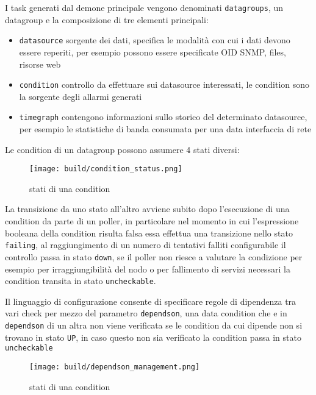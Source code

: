 \documentclass[12pt,a4paper,twoside,openright]{book}
\begin{document}
I task generati dal demone principale vengono denominati \verb|datagroups|, un datagroup e la composizione di tre elementi principali:

\begin{itemize}
  \item \verb|datasource| sorgente dei dati, specifica le modalità con cui i dati devono essere reperiti, per esempio possono essere specificate OID SNMP, files, risorse web
  \item \verb|condition| controllo da effettuare sui datasource interessati, le condition sono la sorgente degli allarmi generati
  \item \verb|timegraph| contengono informazioni sullo storico del determinato datasource, per esempio le statistiche di banda consumata per una data interfaccia di rete
\end{itemize}

Le condition di un datagroup possono assumere 4 stati diversi:

\begin{figure}[H]
    \centering
    \texttt{[image: build/condition\_status.png]}
    \caption{stati di una condition}
    \label{fig:enter-label}
\end{figure}

La transizione da uno stato all'altro avviene subito dopo l'esecuzione di una condition da parte di un poller, in particolare nel momento in cui l'espressione booleana della condition risulta falsa essa effettua una transizione nello stato \verb|failing|, al raggiungimento di un numero di tentativi falliti configurabile il controllo passa in stato \verb|down|, se il poller non riesce a valutare la condizione per esempio per irraggiungibilità del nodo o per fallimento di servizi necessari la condition transita in stato \verb|uncheckable|.

Il linguaggio di configurazione consente di specificare regole di dipendenza tra vari check per mezzo del parametro \verb|dependson|, una data condition che e in \verb|dependson| di un altra non viene verificata se le condition da cui dipende non si trovano in stato \verb|UP|, in caso questo non sia verificato la condition passa in stato \verb|uncheckable|

\begin{figure}[H]
    \centering
    \texttt{[image: build/dependson\_management.png]}
    \caption{stati di una condition}
    \label{fig:enter-label}
\end{figure}
\end{document}
